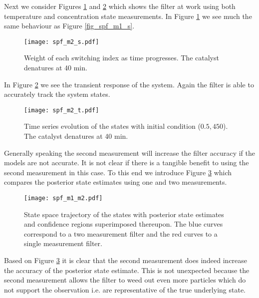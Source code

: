Next we consider Figures \ref{fig_spf_m2_s} and \ref{fig_spf_m2_t} which shows the filter at work using both temperature and concentration state measurements. In Figure \ref{fig_spf_m2_s} we see much the same behaviour as Figure \ref{fig_spf_m1_s}.
\begin{figure}[H] 
\centering
\texttt{[image: spf\_m2\_s.pdf]}
\caption{Weight of each switching index as time progresses. The catalyst denatures at 40 min.}
\label{fig_spf_m2_s}
\end{figure}
In Figure \ref{fig_spf_m2_t} we see the transient response of the system. Again the filter is able to accurately track the system states.
\begin{figure}[H] 
\centering
\texttt{[image: spf\_m2\_t.pdf]}
\caption{Time series evolution of the states with initial condition ($0.5, 450$). The catalyst denatures at 40 min.}
\label{fig_spf_m2_t}
\end{figure}
Generally speaking the second measurement will increase the filter accuracy if the models are not accurate. It is not clear if there is a tangible benefit to using the second measurement in this case. To this end we introduce Figure \ref{fig_spf_m1_m2} which compares the posterior state estimates using one and two measurements. 
\begin{figure}[H] 
\centering
\texttt{[image: spf\_m1\_m2.pdf]}
\caption{State space trajectory of the states with posterior state estimates and confidence regions superimposed thereupon. The blue curves correspond to a two measurement filter and the red curves to a single measurement filter.}
\label{fig_spf_m1_m2}
\end{figure}
Based on Figure \ref{fig_spf_m1_m2} it is clear that the second measurement does indeed increase the accuracy of the posterior state estimate. This is not unexpected because the second measurement allows the filter to weed out even more particles which do not support the observation i.e. are representative of the true underlying state.
